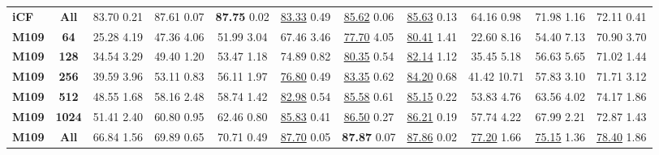 \documentclass{article}
\begin{document}
\begin{table*}
\begin{tabular}{l|c|ccc|ccc|ccc}
    \textbf{iCF} & \textbf{All}
    & 83.70 {\tiny 0.21} 
    & 87.61 {\tiny 0.07} 
    & {\textbf{87.75}} {\tiny 0.02}	
    & \underline{83.33} {\tiny 0.49} 
    & \underline{85.62} {\tiny 0.06} 
    & {\underline{85.63}} {\tiny 0.13}
    & 64.16 {\tiny 0.98} 
    & 71.98 {\tiny 1.16} 
    & {72.11} {\tiny 0.41} \\

    \noalign{\smallskip}
    \hline
    \noalign{\smallskip}
    
    \textbf{M109} & \textbf{64}   
    & 25.28 {\tiny 4.19} 
    & 47.36 {\tiny 4.06} 
    & {51.99} {\tiny 3.04} 
    & 67.46 {\tiny 3.46} 
    & \underline{77.70} {\tiny 4.05} 
    & {\underline{80.41}} {\tiny 1.41} 
    & 22.60 {\tiny 8.16} 
    & 54.40 {\tiny 7.13} 
    & {70.90} {\tiny 3.70} \\
    
    \textbf{M109} & \textbf{128}
    & 34.54 {\tiny 3.29} 
    & 49.40 {\tiny 1.20} 
    & {53.47} {\tiny 1.18} 
    & 74.89 {\tiny 0.82} 
    & \underline{80.35} {\tiny 0.54} 
    & {\underline{82.14}} {\tiny 1.12} 
    & 35.45 {\tiny 5.18} 
    & 56.63 {\tiny 5.65} 
    & {71.02} {\tiny 1.44} \\
    
    \textbf{M109} & \textbf{256}   
    & 39.59 {\tiny 3.96} 
    & 53.11 {\tiny 0.83} 
    & {56.11} {\tiny 1.97} 
    & \underline{76.80} {\tiny 0.49} 
    & \underline{83.35} {\tiny 0.62} 
    & {\underline{84.20}} {\tiny 0.68} 
    & 41.42 {\tiny 10.71}
    & 57.83 {\tiny 3.10} 
    & {71.71} {\tiny 3.12} \\
    
    \textbf{M109} & \textbf{512}   
    & 48.55 {\tiny 1.68} 
    & 58.16 {\tiny 2.48} 
    & {58.74} {\tiny 1.42} 
    & \underline{82.98} {\tiny 0.54} 
    & {\underline{85.58}} {\tiny 0.61} 
    & \underline{85.15} {\tiny 0.22} 
    & 53.83 {\tiny 4.76} 
    & 63.56 {\tiny 4.02} 
    & {74.17} {\tiny 1.86} \\
    
    \textbf{M109} & \textbf{1024}   
    & 51.41 {\tiny 2.40} 
    & 60.80 {\tiny 0.95} 
    & {62.46} {\tiny 0.80} 
    & \underline{85.83} {\tiny 0.41} 
    & {\underline{86.50}} {\tiny 0.27} 
    & \underline{86.21} {\tiny 0.19} 
    & 57.74 {\tiny 4.22} 
    & 67.99 {\tiny 2.21} 
    & {72.87} {\tiny 1.43} \\

    \textbf{M109} & \textbf{All}
    & 66.84 {\tiny 1.56} 
    & 69.89 {\tiny 0.65} 
    & {70.71} {\tiny 0.49}	
    & \underline{87.70} {\tiny 0.05} 
    & {\textbf{87.87}} {\tiny 0.07} 
    & \underline{87.86} {\tiny 0.02}
    & \underline{77.20} {\tiny 1.66} 
    & \underline{75.15} {\tiny 1.36} 
    & {\underline{78.40}} {\tiny 1.86} \\


\end{tabular}
\end{table*}
\end{document}
